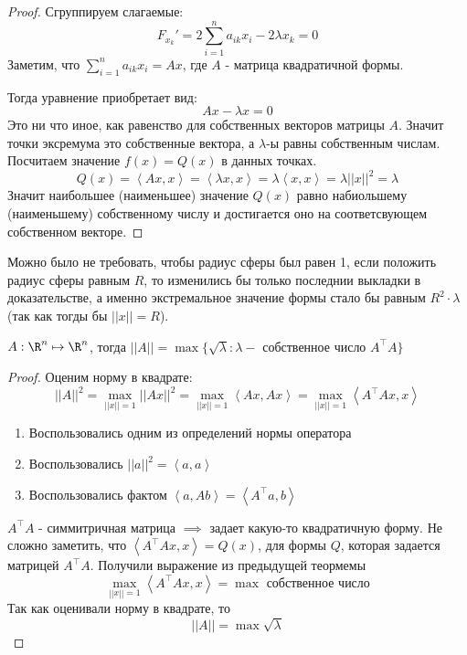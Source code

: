 \begin{theorem}
\begin{proof}
    Сгруппируем слагаемые:
    \[ F_{x_k}' = 2\sum\limits_{i = 1}^{n}a_{ik}x_i - 2\lambda x_k = 0 \]
    Заметим, что $\sum\limits_{i = 1}^{n}a_{ik}x_i = Ax$, где $A$ - матрица квадратичной формы. \par
    Тогда уравнение приобретает вид:
    \[ Ax - \lambda x = 0 \]
    Это ни что иное, как равенство для собственных векторов матрицы $A$. Значит точки эксремума это собственные вектора, а $\lambda$-ы равны собственным числам. Посчитаем значение $f(x) = Q(x)$ в данных точках. 
    \[ Q(x) = \left<Ax, x\right> = \left<\lambda x, x\right> = \lambda \left<x, x\right> = \lambda ||x||^2 = \lambda \]
    Значит наибольшее (наименьшее) значение $Q(x)$ равно набиольшему (наименьшему) собственному числу и достигается оно на соответсвующем собственном векторе.
  \end{proof}

  \begin{remark} \thmslashn

    Можно было не требовать, чтобы радиус сферы был равен 1, если положить радиус сферы равным $R$, то изменились бы только последнии выкладки в доказательстве, а именно экстремальное значение формы стало бы равным $R^2 \cdot \lambda$ (так как тогды бы $||x|| = R$).
  \end{remark}
  

\end{theorem}

\begin{consequence} \thmslashn

  $A : \R^n \mapsto \R^n$, тогда $||A|| = \max \{\sqrt{\lambda} : \lambda - \text{ собственное число } A^{\top}A \}$

  \begin{proof} \thmslashn

    Оценим норму в квадрате:    
    \[ ||A||^2 = \max\limits_{||x|| = 1}{||Ax||^2} = \max\limits_{||x|| = 1}\left<Ax, Ax\right> = \max\limits_{||x||=1}\left<A^{\top}Ax, x\right> \]
    \begin{enumerate}
      \item Воспользовались одним из определений нормы оператора 
      \item Воспользовались $||a||^2 = \left<a, a\right>$ 
      \item Воспользовались фактом $\left<a, Ab\right> = \left<A^{\top}a, b\right>$
    \end{enumerate}
    $A^{\top}A$ - симмитричная матрица $\implies$ задает какую-то квадратичную форму. Не сложно заметить, что $\left<A^{\top}Ax, x\right> = Q(x)$, для формы $Q$, которая задается матрицей $A^{\top}A$.
    Получили выражение из предыдущей теормемы 
    \[ \max\limits_{||x|| = 1}\left<A^{\top}Ax, x\right> = \max \text{ собственное число} \]
    Так как оценивали норму в квадрате, то 
    \[ ||A|| = \max \sqrt{\lambda} \]
  \end{proof}
\end{consequence}
